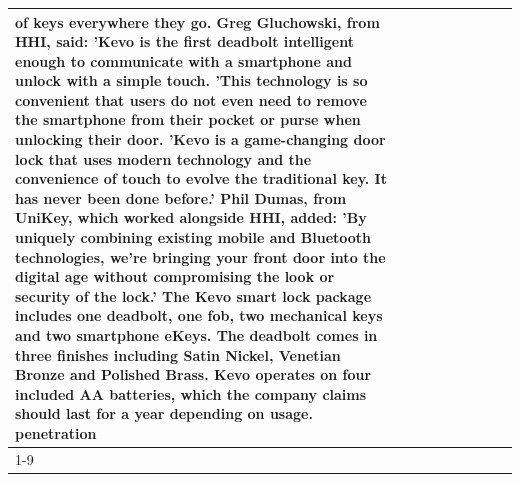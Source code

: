 \begin{table}[H]
\begin{tabular}{lllrlllll}
of keys everywhere they go. Greg Gluchowski, from HHI, said: 'Kevo is the first deadbolt intelligent enough to communicate with a smartphone and unlock with a simple touch. 'This technology is so convenient that users do not even need to remove the smartphone from their pocket or purse when unlocking their door. 'Kevo is a game-changing door lock that uses modern technology and the convenience of touch to evolve the traditional key. It has never been done before.' Phil Dumas, from UniKey, which worked alongside HHI, added: 'By uniquely combining existing mobile and Bluetooth technologies, we’re bringing your front door into the digital age without compromising the look or security of the lock.' The Kevo smart lock package includes one deadbolt, one fob, two mechanical keys and two smartphone eKeys. The deadbolt comes in three finishes including Satin Nickel, Venetian Bronze and Polished Brass. Kevo operates on four included AA batteries, which the company claims should last for a year depending on usage. penetration \\
\cline{1-9}

\end{tabular}
\end{table}
